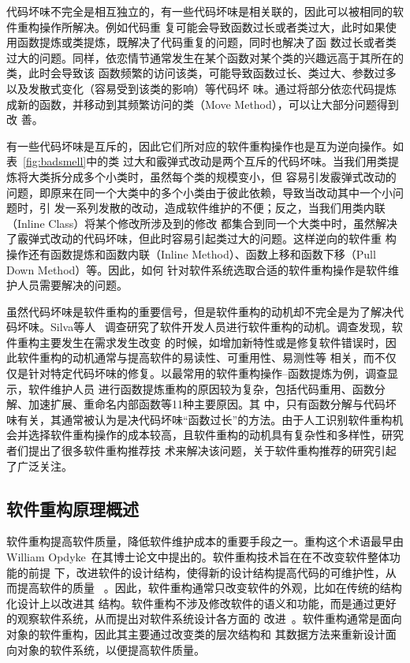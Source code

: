 代码坏味不完全是相互独立的，有一些代码坏味是相关联的，因此可以被相同的软件重构操作所解决。例如代码重
复可能会导致函数过长或者类过大，此时如果使用函数提炼或类提炼，既解决了代码重复的问题，同时也解决了函
数过长或者类过大的问题。同样，依恋情节通常发生在某个函数对某个类的兴趣远高于其所在的类，此时会导致该
函数频繁的访问该类，可能导致函数过长、类过大、参数过多以及发散式变化（容易受到该类的影响）等代码坏
味。通过将部分依恋代码提炼成新的函数，并移动到其频繁访问的类（Move Method），可以让大部分问题得到改
善。

有一些代码坏味是互斥的，因此它们所对应的软件重构操作也是互为逆向操作。如表~\ref{fig:badsmell}中的类
过大和霰弹式改动是两个互斥的代码坏味。当我们用类提炼将大类拆分成多个小类时，虽然每个类的规模变小，但
容易引发霰弹式改动的问题，即原来在同一个大类中的多个小类由于彼此依赖，导致当改动其中一个小问题时，引
发一系列发散的改动，造成软件维护的不便；反之，当我们用类内联（Inline Class）将某个修改所涉及到的修改
都集合到同一个大类中时，虽然解决了霰弹式改动的代码坏味，但此时容易引起类过大的问题。这样逆向的软件重
构操作还有函数提炼和函数内联（Inline Method）、函数上移和函数下移（Pull Down Method）等。因此，如何
针对软件系统选取合适的软件重构操作是软件维护人员需要解决的问题。

虽然代码坏味是软件重构的重要信号，但是软件重构的动机却不完全是为了解决代码坏味。Silva等人
~\cite{Silva2016}调查研究了软件开发人员进行软件重构的动机。调查发现，软件重构主要发生在需求发生改变
的时候，如增加新特性或是修复软件错误时，因此软件重构的动机通常与提高软件的易读性、可重用性、易测性等
相关，而不仅仅是针对特定代码坏味的修复。以最常用的软件重构操作--函数提炼为例，调查显示，软件维护人员
进行函数提炼重构的原因较为复杂，包括代码重用、函数分解、加速扩展、重命名内部函数等11种主要原因。其
中，只有函数分解与代码坏味有关，其通常被认为是决代码坏味``函数过长''的方法。由于人工识别软件重构机
会并选择软件重构操作的成本较高，且软件重构的动机具有复杂性和多样性，研究者们提出了很多软件重构推荐技
术来解决该问题，关于软件重构推荐的研究引起了广泛关注。

\subsection{软件重构原理概述}

软件重构提高软件质量，降低软件维护成本的重要手段之一。重构这个术语最早由William
Opdyke~\cite{opdyke1992refactoring}在其博士论文中提出的。软件重构技术旨在在不改变软件整体功能的前提
下，改进软件的设计结构，使得新的设计结构提高代码的可维护性，从而提高软件的质量
~\cite{fowler1999refactoring}。因此，软件重构通常只改变软件的外观，比如在传统的结构化设计上以改进其
结构。软件重构不涉及修改软件的语义和功能，而是通过更好的观察软件系统，从而提出对软件系统设计各方面的
改进~\cite{chikofsky1990reverse}。软件重构通常是面向对象的软件重构，因此其主要通过改变类的层次结构和
其数据方法来重新设计面向对象的软件系统，以便提高软件质量。

